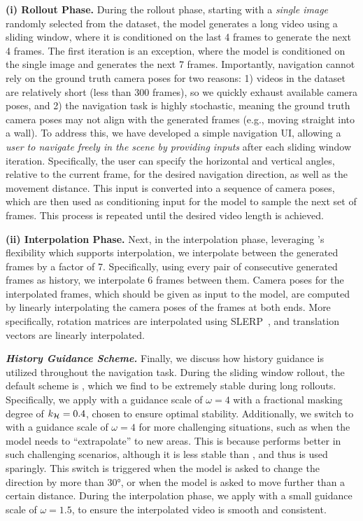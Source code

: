 \textbf{(i) Rollout Phase.} During the rollout phase, starting with a \emph{single image} randomly selected from the dataset, the model generates a long video using a sliding window, where it is conditioned on the last 4 frames to generate the next 4 frames. The first iteration is an exception, where the model is conditioned on the single image and generates the next 7 frames. Importantly, navigation cannot rely on the ground truth camera poses for two reasons: 1) videos in the dataset are relatively short (less than 300 frames), so we quickly exhaust available camera poses, and 2) the navigation task is highly stochastic, meaning the ground truth camera poses may not align with the generated frames (e.g., moving straight into a wall). To address this, we have developed a simple navigation UI, allowing a \emph{user to navigate freely in the scene by providing inputs} after each sliding window iteration. Specifically, the user can specify the horizontal and vertical angles, relative to the current frame, for the desired navigation direction, as well as the movement distance. This input is converted into a sequence of camera poses, which are then used as conditioning input for the model to sample the next set of frames. This process is repeated until the desired video length is achieved. 

\textbf{(ii) Interpolation Phase.} Next, in the interpolation phase, leveraging \mtd's flexibility which supports interpolation, we interpolate between the generated frames by a factor of 7. Specifically, using every pair of consecutive generated frames as history, we interpolate 6 frames between them. Camera poses for the interpolated frames, which should be given as input to the model, are computed by linearly interpolating the camera poses of the frames at both ends. More specifically, rotation matrices are interpolated using SLERP~\cite{shoemake1985animating}, and translation vectors are linearly interpolated.

\textbf{\emph{History Guidance Scheme.}} Finally, we discuss how history guidance is utilized throughout the navigation task. During the sliding window rollout, the default \HG scheme is \HGf, which we find to be extremely stable during long rollouts. Specifically, we apply \HGf with a guidance scale of $\omega = 4$ with a fractional masking degree of $k_{\mathcal{H}} = 0.4$, chosen to ensure optimal stability. Additionally, we switch to \HGv with a guidance scale of $\omega = 4$ for more challenging situations, such as when the model needs to ``extrapolate'' to new areas. This is because \HGv performs better in such challenging scenarios, although it is less stable than \HGf, and thus is used sparingly. This switch is triggered when the model is asked to change the direction by more than 30°, or when the model is asked to move further than a certain distance. During the interpolation phase, we apply \HGv with a small guidance scale of $\omega = 1.5$, to ensure the interpolated video is smooth and consistent.

